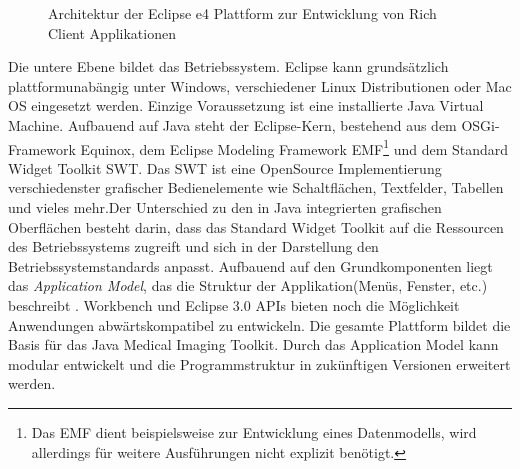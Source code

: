\begin{figure}[htbp]
  \vspace{0.5cm}
  \centering
  \caption{Architektur der Eclipse e4 Plattform zur Entwicklung von Rich Client Applikationen}
  \label{eclipsee4arch}
  \vspace{0.5cm}
\end{figure}

Die untere Ebene bildet das Betriebssystem. Eclipse kann grundsätzlich plattformunabängig unter Windows, verschiedener Linux Distributionen oder Mac OS eingesetzt werden. Einzige Voraussetzung ist eine installierte Java Virtual Machine. Aufbauend auf Java steht der Eclipse-Kern, bestehend aus dem OSGi-Framework Equinox, dem Eclipse Modeling Framework EMF\footnote{Das EMF dient beispielsweise zur Entwicklung eines Datenmodells, wird allerdings für weitere Ausführungen nicht explizit benötigt.} und dem Standard Widget Toolkit SWT. Das SWT ist eine OpenSource Implementierung verschiedenster grafischer Bedienelemente wie Schaltflächen, Textfelder, Tabellen und vieles mehr.Der Unterschied zu den in Java integrierten grafischen Oberflächen besteht darin, dass das Standard Widget Toolkit auf die Ressourcen des Betriebssystems zugreift und sich in der Darstellung den Betriebssystemstandards anpasst\cite{eclipse:swt}. Aufbauend auf den Grundkomponenten liegt das \textit{Application Model}, das die Struktur der Applikation(Menüs, Fenster, etc.) beschreibt \cite[Kapitel 7]{vogel:e4overview}. Workbench und Eclipse 3.0 APIs bieten noch die Möglichkeit Anwendungen abwärtskompatibel zu entwickeln. Die gesamte Plattform bildet die Basis für das Java Medical Imaging Toolkit. Durch das Application Model kann modular entwickelt und die Programmstruktur in zukünftigen Versionen erweitert werden.

